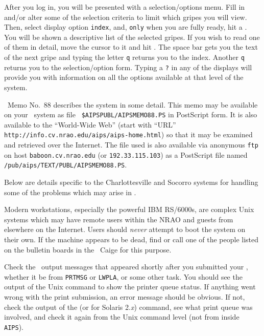      After you log in, you will be presented with a selection/options
menu.  Fill in and/or alter some of the selection criteria to limit
which gripes you will view.  Then, select display option {\tt index},
and, {\tt only} when you are fully ready, hit a \hbox{\CR}.  You will
be shown a descriptive list of the selected gripes.  If you wish to
read one of them in detail, move the cursor to it and hit \hbox{\CR}.
The space bar gets you the text of the next gripe and typing the
letter {\tt q} returns you to the index.  Another {\tt q} returns you
to the selection/option form.  Typing a {\tt ?} in any of the displays
will provide you with information on all the options available at that
level of the system.

\AIPS\ Memo No.~88 describes the system in some detail.  This memo may
be available on your \AIPS\ system as file {\tt
\$AIPSPUBL/AIPSMEMO88.PS} in PostScript form.  It is also available to
the ``World-Wide Web'' (start with ``URL'' {\tt
http://info.cv.nrao.edu/aips/aips-home.html}) so that it may be
examined and retrieved over the Internet.  The file used is also
available via anonymous {\tt ftp} on host {\tt baboon.cv.nrao.edu} (or
{\tt 192.33.115.103}) as a PostScript file named \hbox{{\tt
/pub/aips/TEXT/PUBL/AIPSMEMO88.PS}}.

\vfill\eject
{}

     Below are details specific to the Charlottesville and Socorro
systems for handling some of the problems which may arise in
\hbox{\AIPS}.


     Modern workstations, especially the powerful IBM RS/6000s, are
complex Unix systems which may have remote users within the NRAO and
guests from elsewhere on the Internet.  Users should {\it never}
attempt to boot the system on their own.  If the machine appears to be
dead, find or call one of the people listed on the bulletin boards in
the \AIPS\ Caige for this purpose.


     Check the \AIPS\ output messages that appeared shortly after you
submitted your , whether it be from {\tt PRTMSG} or
{\tt LWPLA}, or some other task.  You should see the output of the
Unix command to show the printer queue status.  If anything went wrong
with the print submission, an error message should be obvious.  If
not, check the output of the {\tt {}} (or {\tt {}}
for Solaris 2.{\it x}) command, see what print queue was involved, and
check it again from the Unix command level (not from inside \hbox{{\tt
AIPS}}).


